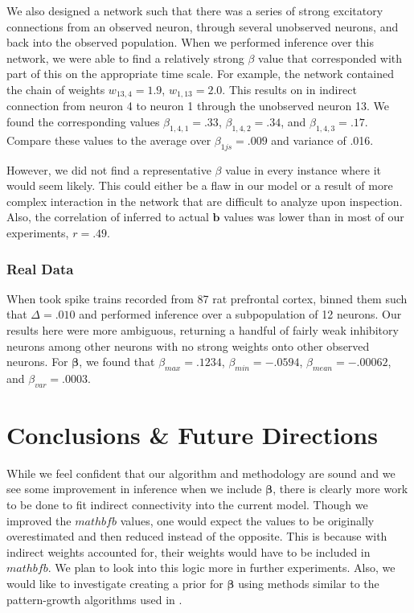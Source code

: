 \documentclass{article}
\begin{document}
We also designed a network such that there was a series of strong excitatory connections from an observed neuron, through several unobserved neurons, and back into the observed population.  When we performed inference over this network, we were able to find a relatively strong $\beta$ value that corresponded with part of this on the appropriate time scale. For example, the network contained the chain of weights $w_{13,4}=1.9$, $w_{1,13}=2.0$. This results on in indirect connection from neuron 4 to neuron 1 through the unobserved neuron 13. We found the corresponding values $\beta_{1,4,1}=.33$, $\beta_{1,4,2}=.34$, and $\beta_{1,4,3}=.17$. Compare these values to the average over $\beta_{1js}=.009$ and variance of .016.

However, we did not find a representative $\beta$ value in every instance where it would seem likely. This could either be a flaw in our model or a result of more complex interaction in the network that are difficult to analyze upon inspection. Also, the correlation of inferred to actual $\mathbf{b}$ values was lower than in most of our experiments, $r=.49$.

\subsubsection{Real Data}

When took spike trains recorded from 87 rat prefrontal cortex, binned them such that $\Delta = .010$ and performed inference over a subpopulation of 12 neurons. Our results here were more ambiguous, returning a handful of fairly weak inhibitory neurons among other neurons with no strong weights onto other observed neurons. For  $\bm{\beta}$, we found that $\beta_{max}=.1234$, $\beta_{min}=-.0594$, $\beta_{mean}=-.00062$, and $\beta_{var}=.0003$.

\section{Conclusions \& Future Directions}

While we feel confident that our algorithm and methodology are sound and we see some improvement in inference when we include $\bm{\beta}$, there is clearly more work to be done to fit indirect connectivity into the current model. Though we improved the $mathbf{b}$ values, one would expect the values to be originally overestimated and then reduced instead of the opposite. This is because with indirect weights accounted for, their weights would have to be included in $mathbf{b}$. We plan to look into this logic more in further experiments. Also, we would like to investigate creating a prior for $\bm{\beta}$ using methods similar to the pattern-growth algorithms used in \citep{patnaik2011}.
\end{document}
